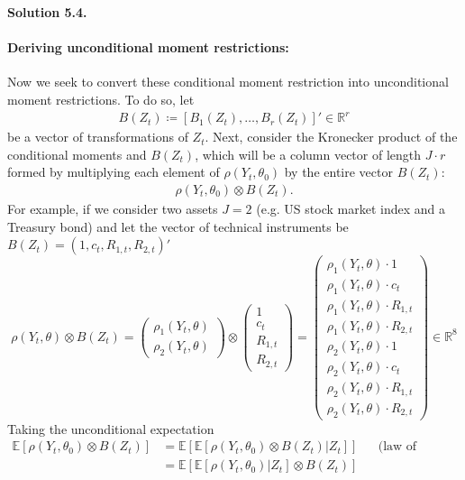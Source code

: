 \documentclass[11pt]{article}
\newenvironment{solution}[1]
    {\bigskip\noindent\textbf{Solution #1.} \par}
    {\medskip}
\newcommand{\ev}{\mathbb{E}}
\newcommand{\R}{\mathbb{R}}
\begin{document}
\begin{solution}{5.4}
\paragraph{Deriving unconditional moment restrictions:} Now we seek to convert these conditional moment restriction into unconditional moment restrictions. To do so, let
\begin{align*}
    B(Z_t) \coloneq [B_1(Z_t), \ldots,B_r(Z_t)]' \in \R^r
\end{align*}
be a vector of transformations of $Z_t.$ Next, consider the Kronecker product of the conditional moments and $B(Z_t)$, which will be a column vector of length $J\cdot r$ formed by multiplying each element of $\rho(Y_t,\theta_0)$ by the entire vector $B(Z_t):$
\begin{align*}
    \rho(Y_t,\theta_0) \otimes B(Z_t).
\end{align*}
For example, if we consider two assets $J=2$ (e.g. US stock market index and a Treasury bond) and let the vector of technical instruments be $B(Z_t) = (1,c_t,R_{1,t}, R_{2,t})'$
\[
\rho(Y_t, \theta) \otimes B(Z_t) 
= 
\begin{pmatrix} \rho_1(Y_t, \theta) \\ \rho_2(Y_t, \theta) \end{pmatrix}
\otimes
\begin{pmatrix} 1 \\ c_t \\ R_{1,t} \\ R_{2,t} \end{pmatrix}
=
\begin{pmatrix} 
\rho_1(Y_t,\theta) \cdot 1 \\ 
\rho_1(Y_t,\theta) \cdot c_t \\ 
\rho_1(Y_t,\theta) \cdot R_{1,t} \\ 
\rho_1(Y_t,\theta) \cdot R_{2,t} \\ 
\rho_2(Y_t,\theta) \cdot 1 \\ 
\rho_2(Y_t,\theta) \cdot c_t \\ 
\rho_2(Y_t,\theta) \cdot R_{1,t} \\ 
\rho_2(Y_t,\theta) \cdot R_{2,t}
\end{pmatrix}
\in \mathbb{R}^{8}
\]
Taking the unconditional expectation
\begin{align*}
    \ev\left[\rho(Y_t, \theta_0) \otimes B(Z_t) \right]
    &= \ev\left[ \ev\left[\rho(Y_t, \theta_0) \otimes B(Z_t) |Z_t\right] \right] &&\text{(law of iterated expectations)} \\
    &= \ev\left[ \ev\left[\rho(Y_t, \theta_0)  |Z_t\right] \otimes B(Z_t)\right] \\

\end{align*}
\end{solution}
\end{document}
